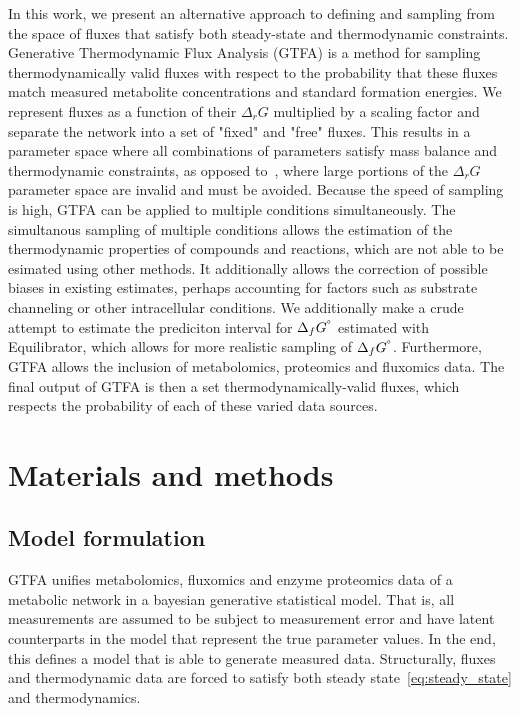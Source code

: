 \documentclass[10pt,letterpaper]{article}
\newcommand{\sdgf}{\Delta_fG^{\degree}}
\newcommand{\dgr}{\Delta_rG}
\begin{document}
In this work, we present an alternative approach to defining and sampling from the space of fluxes that satisfy both steady-state and thermodynamic constraints.
Generative Thermodynamic Flux Analysis (GTFA) is a method for sampling thermodynamically valid fluxes with respect to the probability that these fluxes match measured metabolite concentrations and standard formation energies.
We represent fluxes as a function of their $\dgr$ multiplied by a scaling factor and separate the network into a set of "fixed" and "free" fluxes.
This results in a parameter space where all combinations of parameters satisfy mass balance and thermodynamic constraints, as opposed to~\cite{PTA}, where large portions of the $\dgr$ parameter space are invalid and must be avoided.
Because the speed of sampling is high, GTFA can be applied to multiple conditions simultaneously.
The simultanous sampling of multiple conditions allows the estimation of the thermodynamic properties of compounds and reactions, which are not able to be esimated using other methods.
It additionally allows the correction of possible biases in existing estimates, perhaps accounting for factors such as substrate channeling or other intracellular conditions.
We additionally make a crude attempt to estimate the prediciton interval for $\sdgf$ estimated with Equilibrator, which allows for more realistic sampling of $\sdgf$.
Furthermore, GTFA allows the inclusion of metabolomics, proteomics and fluxomics data.
The final output of GTFA is then a set thermodynamically-valid fluxes, which respects the probability of each of these varied data sources.




\section*{Materials and methods}

\subsection{Model formulation}
GTFA unifies metabolomics, fluxomics and enzyme proteomics data of a metabolic network in a bayesian generative statistical model.
That is, all measurements are assumed to be subject to measurement error and have latent counterparts in the model that represent the true parameter values.
In the end, this defines a model that is able to generate measured data.
Structurally, fluxes and thermodynamic data are forced to satisfy both steady state~\ref{eq:steady_state} and thermodynamics.
\end{document}
